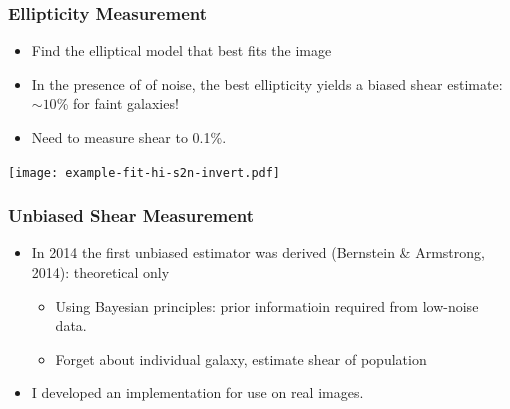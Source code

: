 \documentclass{beamer}
\begin{document}
\frame
{
    \frametitle{Ellipticity Measurement}

    \begin{itemize}

        \item Find the elliptical model that best fits the image

        \item In the presence of of noise, the best ellipticity yields a
            biased shear estimate: {\color{gold} $\sim 10$\%} for faint galaxies!
        \item Need to measure shear to {\color{gold} 0.1\%}.

    \end{itemize}
    \begin{center}


        \texttt{[image: example-fit-hi-s2n-invert.pdf]}
    \end{center}
}



\frame
{
    \frametitle{Unbiased Shear Measurement}

 
    \begin{itemize}

        \item In 2014 the first unbiased estimator was derived (Bernstein \&
            Armstrong, 2014):  theoretical only

            \begin{itemize}
                \item Using Bayesian principles: prior informatioin required from
                    low-noise data.

                \item Forget about individual galaxy, estimate shear of population
            \end{itemize}

        \item I developed an implementation for use on real images.


    \end{itemize}
}
\end{document}
